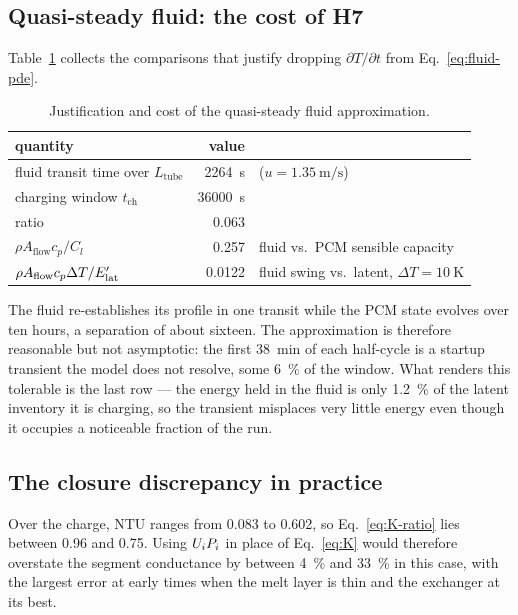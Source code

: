 \subsection{Quasi-steady fluid: the cost of H7}

Table~\ref{tab:h7} collects the comparisons that justify dropping
$\partial T/\partial t$ from Eq.~\eqref{eq:fluid-pde}.

\begin{table}[htbp]
\centering
\caption{Justification and cost of the quasi-steady fluid approximation.}
\label{tab:h7}
\begin{tabular}{@{}l r l@{}}
\toprule
quantity & value & \\
\midrule
fluid transit time over $L_{\mathrm{tube}}$ & \SI{2264}{\second}
  & ($u=\SI{1.35}{\meter\per\second}$) \\
charging window $t_{\mathrm{ch}}$ & \SI{36000}{\second} & \\
ratio & \num{0.063} & \\
$\rho A_{\mathrm{flow}}c_{p}/C_{l}$ & \num{0.257}
  & fluid vs.\ PCM sensible capacity \\
$\rho A_{\mathrm{flow}}c_{p}\Delta T/E'_{\mathrm{lat}}$ & \num{0.0122}
  & fluid swing vs.\ latent, $\Delta T=\SI{10}{\kelvin}$ \\
\bottomrule
\end{tabular}
\end{table}

\noindent
The fluid re-establishes its profile in one transit while the PCM state evolves
over ten hours, a separation of about sixteen. The approximation is therefore
reasonable but not asymptotic: the first \SI{38}{\minute} of each half-cycle is
a startup transient the model does not resolve, some \SI{6}{\percent} of the
window. What renders this tolerable is the last row --- the energy held in the
fluid is only \SI{1.2}{\percent} of the latent inventory it is charging, so the
transient misplaces very little energy even though it occupies a noticeable
fraction of the run.

\subsection{The closure discrepancy in practice}

Over the charge, $\mathrm{NTU}$ ranges from \num{0.083} to \num{0.602}, so
Eq.~\eqref{eq:K-ratio} lies between \num{0.96} and \num{0.75}. Using
$U_{i} P_{i}$ in place of Eq.~\eqref{eq:K} would therefore overstate the segment
conductance by between \SI{4}{\percent} and \SI{33}{\percent} in this case, with
the largest error at early times when the melt layer is thin and the exchanger
at its best.

